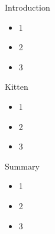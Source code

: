 \documentclass[aspectratio=169]{beamer}
\begin{document}
\begin{frame}{Introduction}
	\begin{itemize}
		\item 1
		\item 2
		\item 3
	\end{itemize}
\end{frame}


{
	\begin{frame}{Kitten}
		\begin{itemize}
			\item 1
			\item 2
			\item 3
		\end{itemize}
	\end{frame}
}

\begin{frame}{Summary}
	\begin{itemize}
		\item 1
		\item 2
		\item 3
	\end{itemize}
\end{frame}
\end{document}
